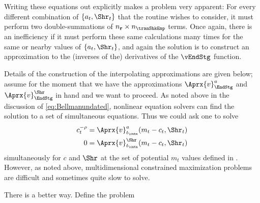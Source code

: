 \documentclass[titlepage, headings=optiontotocandhead]{econtex}
\begin{document}
Writing these equations out explicitly makes a problem very apparent: For every different combination of $\{{a}_{t},\Shr_{t}\}$ that the routine wishes to consider, it must perform two double-summations of $n_{{\mathbf{r}}} \times n_{\tranShkEmp}$ terms.  Once again, there is an inefficiency if it must perform these same calculations many times for the same or nearby values of $\{{a}_{t},\Shr_{t}\}$, and again the solution is to construct an approximation to the (inverses of the) derivatives of the $\vEndStg$ function.

Details of the construction of the interpolating approximations are given below; assume for the moment that we have the approximations $\Aprx{v}_{\EndStg}^{a}$ and $\Aprx{v}_{\EndStg}^{\Shr}$ in hand and we want to proceed.  As noted above in the discussion of \eqref{eq:Bellmanundated}, nonlinear equation solvers can find the solution to a set of simultaneous equations.  Thus we could ask one to solve
\begin{equation}\begin{gathered}\begin{aligned}
      c_{t}^{-\rho}  & = \Aprx{v}^{a}_{{t_\cntn}}(m_{t}-c_{t},\Shr_{t}) %
      \\      0  & = \Aprx{v}^{\Shr}_{{t_\cntn}}(m_{t}-c_{t},\Shr_{t}) \label{eq:FOCwrtw}
    \end{aligned}\end{gathered}\end{equation}
simultaneously for $c$ and $\Shr$ at the set of potential $m_{t}$ values defined in {\mVec}. However, as noted above, multidimensional constrained
maximization problems are difficult and sometimes quite slow to
solve.

There is a better way.  Define the problem
\end{document}
